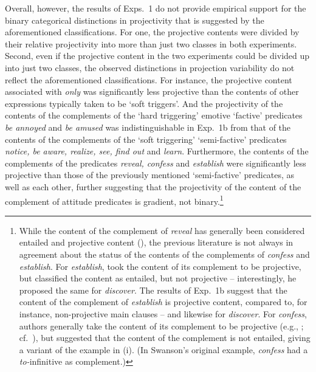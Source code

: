 \documentclass[11pt,fleqn]{article}
\newcommand{\6}{\mbox{$[\hspace*{-.6mm}[$}}
\newcommand{\9}{\mbox{$]\hspace*{-.6mm}]$}}
\begin{document}
Overall, however, the results of Exps.~1 do not provide empirical support for the binary categorical distinctions in projectivity that is suggested by the aforementioned classifications. For one, the projective contents were divided by their relative projectivity into more than just two classes in both experiments. Second, even if the projective content in the two experiments could be divided up into just two classes, the observed distinctions in projection variability do not reflect the aforementioned classifications. For instance, the projective content associated with {\em only} was significantly less projective than the contents of other expressions typically taken to be `soft triggers'. And the projectivity of the contents of the complements of the `hard triggering' emotive `factive' predicates {\em be annoyed} and {\em be amused} was indistinguishable in Exp.~1b from that of the contents of the complements of the `soft triggering' `semi-factive' predicates {\em notice, be aware, realize, see, find out} and {\em learn}. Furthermore, the contents of the complements of the predicates {\em reveal, confess} and {\em establish} were significantly less projective than those of the previously mentioned `semi-factive' predicates, as well as each other, further suggesting that the projectivity of the content of the complement of attitude predicates is gradient, not binary.\footnote{While the content of the complement of {\em reveal} has generally been considered entailed and projective content (\citealt{hooper1974,melvold1991}), the previous literature is not always in agreement about the status of the contents of the complements of {\em confess} and {\em establish}. For {\em establish}, \citet{wyse} took the content of its complement to be projective, but \citet{swanson2012} classified the content as entailed, but not projective -- interestingly, he proposed the same for {\em discover}. The results of Exp.~1b suggest that the content of the complement of {\em establish} is projective content, compared to, for instance, non-projective main clauses -- and likewise for {\em discover}. For {\em confess}, authors generally take the content of its complement to be projective (e.g., \citealt{reis1973,melvold1991,schultz2003,swanson2012,karttunen2016}; cf.\ \citealt{wyse}), but \citet{swanson2012} suggested that the content of the complement is not entailed, giving a variant of the example in (i). (In Swanson's original example, {\em confess} had a {\em to-}infinitive as complement.)

}
\end{document}
